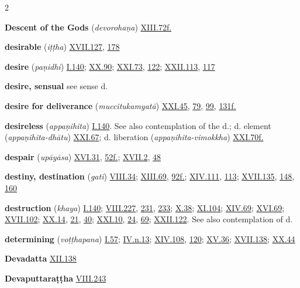 \begin{multicols}{2}
\begin{vismHanging}
\par\textbf{Descent of the Gods} (\emph{devorohaṇa}) \hyperlink{XIII.72}{XIII.72f.}{}
\par\textbf{desirable} (\emph{iṭṭha}) \hyperlink{XVII.127}{XVII.127}{}, \hyperlink{XVII.178}{178}{}
\par\textbf{desire} (\emph{paṇidhi}) \hyperlink{I.140}{I.140}{}; \hyperlink{XX.90}{XX.90}{}; \hyperlink{XXI.73}{XXI.73}{}, \hyperlink{XXI.122}{122}{}; \hyperlink{XXII.113}{XXII.113}{}, \hyperlink{XXII.117}{117}{}
\par\textbf{desire, sensual} see sense d.
\par\textbf{desire for deliverance} (\emph{muccitukamyatā}) \hyperlink{XXI.45}{XXI.45}{}, \hyperlink{XXI.79}{79}{}, \hyperlink{XXI.99}{99}{}, \hyperlink{XXI.131}{131f.}{}
\par\textbf{desireless} (\emph{appaṇihita}) \hyperlink{I.140}{I.140}{}. See also contemplation of the d.; d. element (\emph{appaṇihita-dhātu}) \hyperlink{XXI.67}{XXI.67}{}; d. liberation (\emph{appaṇihita-vimokkha}) \hyperlink{XXI.70}{XXI.70f.}{}
\par\textbf{despair} (\emph{upāyāsa}) \hyperlink{XVI.31}{XVI.31}{}, \hyperlink{XVI.52}{52f.}{}; \hyperlink{XVII.2}{XVII.2}{}, \hyperlink{XVII.48}{48}{}
\par\textbf{destiny, destination} (\emph{gati}) \hyperlink{VIII.34}{VIII.34}{}; \hyperlink{XIII.69}{XIII.69}{}, \hyperlink{XIII.92}{92f.}{}; \hyperlink{XIV.111}{XIV.111}{}, \hyperlink{XIV.113}{113}{}; \hyperlink{XVII.135}{XVII.135}{}, \hyperlink{XVII.148}{148}{}, \hyperlink{XVII.160}{160}{}
\par\textbf{destruction} (\emph{khaya}) \hyperlink{I.140}{I.140}{}; \hyperlink{VIII.227}{VIII.227}{}, \hyperlink{VIII.231}{231}{}, \hyperlink{VIII.233}{233}{}; \hyperlink{X.38}{X.38}{}; \hyperlink{XI.104}{XI.104}{}; \hyperlink{XIV.69}{XIV.69}{}; \hyperlink{XVI.69}{XVI.69}{}; \hyperlink{XVII.102}{XVII.102}{}; \hyperlink{XX.14}{XX.14}{}, \hyperlink{XX.21}{21}{}, \hyperlink{XX.40}{40}{}; \hyperlink{XXI.10}{XXI.10}{}, \hyperlink{XXI.24}{24}{}, \hyperlink{XXI.69}{69}{}; \hyperlink{XXII.122}{XXII.122}{}. See also contemplation of d.
\par\textbf{determining} (\emph{voṭṭhapana}) \hyperlink{I.57}{I.57}{}; \hyperlink{IV.n13}{IV.n.13}{}; \hyperlink{XIV.108}{XIV.108}{}, \hyperlink{XIV.120}{120}{}; \hyperlink{XV.36}{XV.36}{}; \hyperlink{XVII.138}{XVII.138}{}; \hyperlink{XX.44}{XX.44}{}
\par\textbf{Devadatta} \hyperlink{XII.138}{XII.138}{}
\par\textbf{Devaputtaraṭṭha} \hyperlink{VIII.243}{VIII.243}{}

\end{vismHanging}
\end{multicols}
